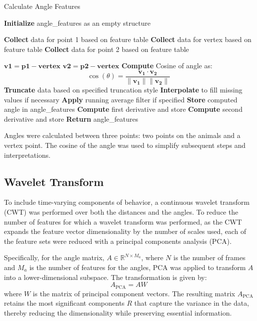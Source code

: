 \documentclass[12pt,english]{article}
\begin{document}
\begin{algorithm}
\caption{Calculate Angle Features}
\begin{algorithmic}[1]
\State \textbf{Initialize} angle\_features as an empty structure

        \State \textbf{Collect} data for point 1 based on feature table
        \State \textbf{Collect} data for vertex based on feature table
        \State \textbf{Collect} data for point 2 based on feature table
        
        \State $ \mathbf{v1} = \mathbf{p1} - \mathbf{vertex} $
        \State $ \mathbf{v2} = \mathbf{p2} - \mathbf{vertex} $
        \State \textbf{Compute} Cosine of angle as:
        \[
        \cos(\theta) = \frac{\mathbf{v_1} \cdot \mathbf{v_2}}{\|\mathbf{v_1}\| \|\mathbf{v_2}\|}
        \]
        \State \textbf{Truncate} data based on specified truncation style
        \State \textbf{Interpolate} to fill missing values if necessary
        \State \textbf{Apply} running average filter if specified
        \State \textbf{Store} computed angle in angle\_features
            \State \textbf{Compute} first derivative and store
                \State \textbf{Compute} second derivative and store
            \EndIf
        \EndIf
    \EndIf
\EndFor
\State \textbf{Return} angle\_features
\end{algorithmic}
\end{algorithm}

Angles were calculated between three points: two points on the animals and a vertex point. The cosine of the angle was used to simplify subsequent steps and interpretations.


\subsection{Wavelet Transform}
To include time-varying components of behavior, a continuous wavelet transform (CWT) was performed over both the distances and the angles. To reduce the number of features for which a wavelet transform was performed, as the CWT expands the feature vector dimensionality by the number of scales used, each of the feature sets were reduced with a principal components analysis (PCA).

Specifically, for the angle matrix, \( A \in \mathbb{R}^{N \times M_{a}} \), where \( N \) is the number of frames and \( M_{a} \) is the number of features for the angles, PCA was applied to transform \( A \) into a lower-dimensional subspace. The transformation is given by:
\[
A_{\text{PCA}} = A W
\]
where \( W \) is the matrix of principal component vectors. The resulting matrix \( A_{\text{PCA}} \) retains the most significant components \( R \) that capture the variance in the data, thereby reducing the dimensionality while preserving essential information.
\end{document}
